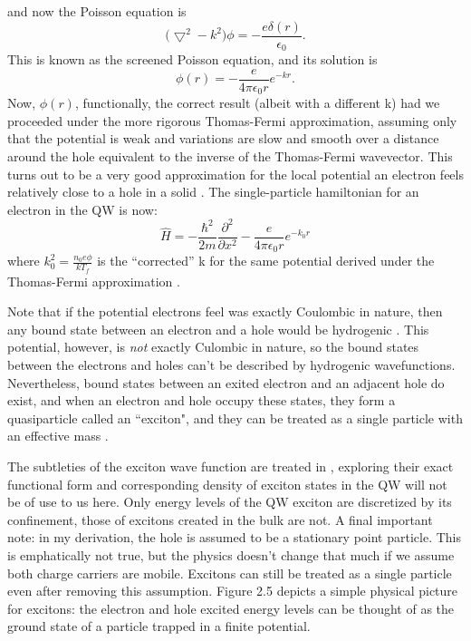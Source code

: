 and now the Poisson equation is
\begin{equation}
\big(\bigtriangledown^2 - k^2 \big) \phi = - \frac{e \delta(r)}{\epsilon_0}.
\end{equation}
This is known as the screened Poisson equation, and its solution is
\begin{equation}
\phi(r) = -\frac{e}{4\pi \epsilon_0 r} e^{-k r}.
\end{equation}
\indent Now, $\phi(r)$, functionally,  the correct result (albeit with a different k) had we proceeded under the more rigorous Thomas-Fermi approximation, assuming only that the potential is weak and variations are slow and smooth over a distance around the hole equivalent to the inverse of the Thomas-Fermi wavevector. This turns out to be a very good approximation for the local potential an electron feels relatively close to a hole in a solid \cite{patterson}. The single-particle hamiltonian for an electron in the QW is now:
\begin{equation}
\hat{H} = - \frac{\hbar^2}{2m} \frac{\partial^2}{\partial x^2} - \frac{e}{4\pi \epsilon_0 r} e^{-k_0 r}
\end{equation}
where $k_0^2 = \frac{n_0 e\phi}{k T_f}$ is the ``corrected'' k for the same potential derived under the Thomas-Fermi approximation \cite{patterson}. 

\indent Note that if the potential electrons feel was exactly Coulombic in nature, then any bound state between an electron and a hole would be hydrogenic \cite{griffiths}. This potential, however, is \textit{not} exactly Culombic in nature, so the bound states between the electrons and holes can't be described by hydrogenic wavefunctions. Nevertheless, bound states between an exited electron and an adjacent hole do exist, and when an electron and hole occupy these states, they form a quasiparticle called an ``exciton", and they can be treated as a single particle with an effective mass \cite{iadonisi, davies}.

\indent The subtleties of the exciton wave function are treated in \cite{iadonisi}, exploring their exact functional form and corresponding density of exciton states in the QW will not be of use to us here. Only energy levels of the QW exciton are discretized by its confinement, those of excitons created in the bulk are not. A final important note: in my derivation, the hole is assumed to be a stationary point particle. This is emphatically not true, but the physics doesn't change that much if we assume both charge carriers are mobile. Excitons can still be treated as a single particle even after removing this assumption. Figure 2.5 depicts a simple physical picture for excitons: the electron and hole excited energy levels can be thought of as the ground state of a particle trapped in a finite potential.  

